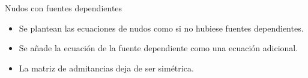 \documentclass[aspectratio=169, usenames,svgnames,dvipsnames]{beamer}
\begin{document}
\begin{frame}[label={sec:org3d2383f}]{Nudos con fuentes dependientes}
\begin{itemize}
\item Se plantean las ecuaciones de nudos como si no hubiese fuentes dependientes.
\item Se añade la ecuación de la fuente dependiente como una ecuación adicional.
\item La matriz de admitancias deja de ser simétrica.
\end{itemize}
\end{frame}
\end{document}
